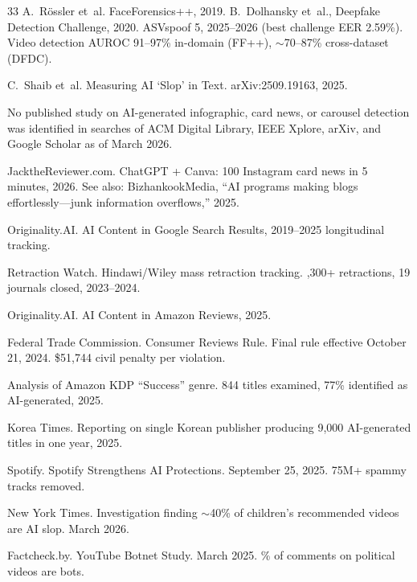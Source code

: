 \documentclass[12pt]{article}
\begin{document}
\begin{thebibliography}{33}
A.~R{\"o}ssler et~al.
\newblock FaceForensics++, 2019.
\newblock B.~Dolhansky et~al., Deepfake Detection Challenge, 2020.
\newblock ASVspoof 5, 2025--2026 (best challenge EER 2.59\%).
\newblock Video detection AUROC 91--97\% in-domain (FF++), ${\sim}$70--87\% cross-dataset (DFDC).

C.~Shaib et~al.
\newblock Measuring AI `Slop' in Text.
\newblock arXiv:2509.19163, 2025.

No published study on AI-generated infographic, card news, or carousel detection was identified in searches of ACM Digital Library, IEEE Xplore, arXiv, and Google Scholar as of March 2026.

JacktheReviewer.com.
\newblock ChatGPT + Canva: 100 Instagram card news in 5 minutes, 2026.
\newblock See also: BizhankookMedia, ``AI programs making blogs effortlessly---junk information overflows,'' 2025.

Originality.AI.
\newblock AI Content in Google Search Results, 2019--2025 longitudinal tracking.

Retraction Watch.
\newblock Hindawi/Wiley mass retraction tracking.
,300+ retractions, 19 journals closed, 2023--2024.

Originality.AI.
\newblock AI Content in Amazon Reviews, 2025.

Federal Trade Commission.
\newblock Consumer Reviews Rule.
\newblock Final rule effective October 21, 2024. \$51,744 civil penalty per violation.

Analysis of Amazon KDP ``Success'' genre. 844 titles examined, 77\% identified as AI-generated, 2025.

Korea Times.
\newblock Reporting on single Korean publisher producing 9,000 AI-generated titles in one year, 2025.

Spotify.
\newblock Spotify Strengthens AI Protections.
\newblock September 25, 2025.
\newblock 75M+ spammy tracks removed.

New York Times.
\newblock Investigation finding ${\sim}$40\% of children's recommended videos are AI slop.
\newblock March 2026.

Factcheck.by.
\newblock YouTube Botnet Study.
\newblock March 2025.
\% of comments on political videos are bots.


\end{thebibliography}
\end{document}
